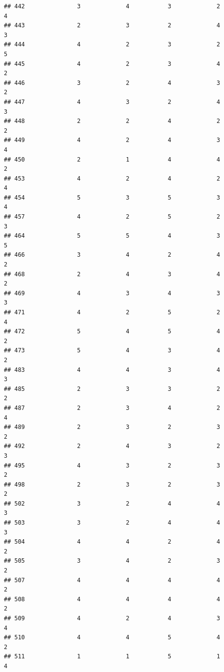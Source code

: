\documentclass[
]{article}
\begin{document}
\begin{verbatim}
## 442               3             4           3             2            4
## 443               2             3           2             4            3
## 444               4             2           3             2            5
## 445               4             2           3             4            2
## 446               3             2           4             3            2
## 447               4             3           2             4            3
## 448               2             2           4             2            2
## 449               4             2           4             3            4
## 450               2             1           4             4            2
## 453               4             2           4             2            4
## 454               5             3           5             3            4
## 457               4             2           5             2            3
## 464               5             5           4             3            5
## 466               3             4           2             4            2
## 468               2             4           3             4            2
## 469               4             3           4             3            3
## 471               4             2           5             2            4
## 472               5             4           5             4            2
## 473               5             4           3             4            2
## 483               4             4           3             4            3
## 485               2             3           3             2            2
## 487               2             3           4             2            4
## 489               2             3           2             3            2
## 492               2             4           3             2            3
## 495               4             3           2             3            2
## 498               2             3           2             3            2
## 502               3             2           4             4            3
## 503               3             2           4             4            3
## 504               4             4           2             4            2
## 505               3             4           2             3            2
## 507               4             4           4             4            2
## 508               4             4           4             4            2
## 509               4             2           4             3            4
## 510               4             4           5             4            2
## 511               1             1           5             1            4

\end{verbatim}
\end{document}
